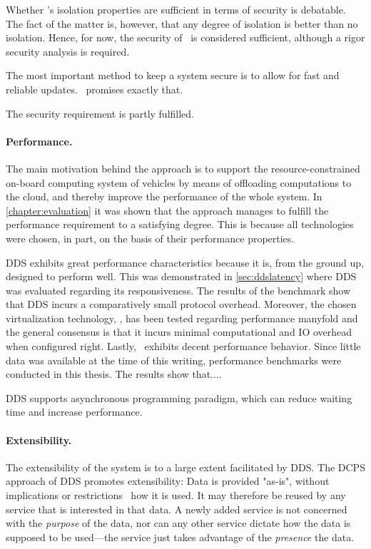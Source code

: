 Whether \docker 's isolation properties are sufficient in terms of security is debatable. The fact of the matter is, however, that any degree of isolation is better than no isolation. Hence, for now, the security of \docker\ is considered sufficient, although a rigor security analysis is required.

The most important method to keep a system secure is to allow for fast and reliable updates. \docker\ promises exactly that.

The security requirement is partly fulfilled.

\paragraph{Performance.}
The main motivation behind the approach is to support the resource-constrained on-board computing system of vehicles by means of offloading computations to the cloud, and thereby improve the performance of the whole system. In \autoref{chapter:evaluation} it was shown that the approach manages to fulfill the performance requirement to a satisfying degree. This is because all technologies were chosen, in part, on the basis of their performance properties.

DDS exhibits great performance characteristics because it is, from the ground up, designed to perform well. This was demonstrated in \autoref{sec:ddslatency} where DDS was evaluated regarding its responsiveness. The results of the benchmark show that DDS incurs a comparatively small protocol overhead. Moreover, the chosen virtualization technology, \docker , has been tested regarding performance manyfold  \cite{felter2015updated,morabito2015hypervisors} and the general consensus is that it incurs minimal computational and IO overhead when configured right. Lastly, \wnet\ exhibits decent performance behavior. Since little data was available at the time of this writing, performance benchmarks were conducted in this thesis. The results show that....

DDS supports asynchronous programming paradigm, which can reduce waiting time and increase performance.

\paragraph{Extensibility.}
The extensibility of the system is to a large extent facilitated by DDS. The DCPS approach of DDS promotes extensibility: Data is provided "as-is", without implications or restrictions \wrt\ how it is used. It may therefore be reused by any service that is interested in that data. A newly added service is not concerned with the \emph{purpose} of the data, nor can any other service dictate how the data is supposed to be used---the service just takes advantage of the \emph{presence} the data.


